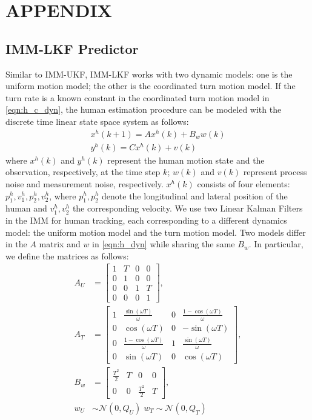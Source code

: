 \documentclass[letterpaper, 10 pt, conference]{ieeeconf}
\begin{document}
	\section{APPENDIX}
	\subsection{IMM-LKF Predictor}
	Similar to IMM-UKF, IMM-LKF works with two dynamic models: one is the uniform motion model; the other is the coordinated turn motion model. If the turn rate is a known constant in the coordinated turn motion model in \cref{eqn:h_c_dyn}, the human estimation procedure can be modeled with the discrete time linear state space system as follows:
	\begin{subequations}
		\begin{align}
			x^h(k+1) = Ax^h(k)+B_ww(k)\label{eqn:h_dyn}\\
			y^h(k)=Cx^h(k)+v(k)\label{eqn:observation}
		\end{align}
	\end{subequations}
	where $x^h(k)$ and $y^h(k)$ represent the human motion state and the observation, respectively, at the time step $k$; $w(k)$ and $v(k)$ represent process noise and measurement noise, respectively.
	$x^h(k)$ consists of four elements: $p^h_1,v^h_1,p^h_2,v^h_2$, where $p^h_1,p^h_2$ denote the longitudinal and lateral position of the human and $v^h_1,v^h_2$ the corresponding velocity.
	We use two Linear Kalman Filters in the IMM for human tracking, each corresponding to a different dynamics model: the uniform motion model and the turn motion model.
	Two models differ in the $A$ matrix and $w$ in \cref{eqn:h_dyn} while sharing the same $B_w$.
	In particular, we define the matrices as follows:
	\begin{subequations}
		\begin{align}
			A_U&=\left[
			\begin{array}{cccc}
				1& T& 0& 0\\
				0& 1& 0& 0\\
				0& 0& 1& T\\
				0& 0& 0& 1
			\end{array}\right],\label{eqn:A_U}\\
			A_T&=\left[
			\begin{array}{cccc}
				1& \frac{\sin(\omega T)}{\omega}& 0& \frac{1-\cos(\omega T)}{\omega}\\
				0& \cos(\omega T)& 0& -\sin(\omega T)\\
				0& \frac{1-\cos(\omega T)}{\omega}& 1& \frac{\sin(\omega T)}{\omega}\\
				0& \sin(\omega T)& 0& \cos(\omega T)
			\end{array}\right],\label{eqn:A_T}\\
			B_w&=\left[
			\begin{array}{cccc}
				\frac{T^2}{2}& T& 0& 0\\
				0& 0& \frac{T^2}{2}& T
			\end{array}\right],\label{eqn:B_w}\\
			w_U&\sim\mathcal{N}(0,Q_U)\; w_T\sim\mathcal{N}(0,Q_T)\label{eqn:pro_noise}
		\end{align}
	\end{subequations}
\end{document}
